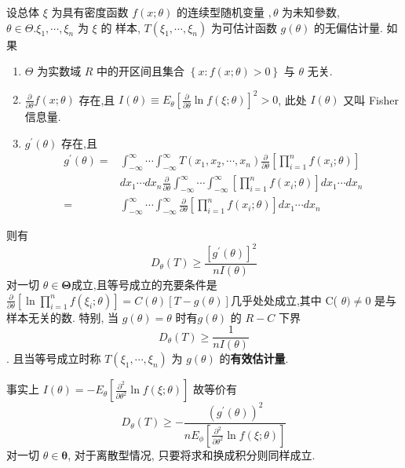 \documentclass[10pt]{yerbaformat}
\begin{document}
\begin{theorem}{\label{cr}}
    设总体 $\xi$ 为具有密度函数 $f(x ; \theta)$ 的连续型随机变量 $, \theta$ 为未知參数, $\theta \in \Theta . \xi_{1}, \cdots, \xi_{n}$ 为 $\xi$ 的 样本, $T\left(\xi_{1}, \cdots, \xi_{n}\right)$ 为可估计函数 $g(\theta)$ 的无偏估计量. 如果
    \begin{enumerate}
        \item $\Theta$ 为实数域 $R$ 中的开区间且集合 $\left\{x: f(x; \theta)>0 \right\}$ 与 $\theta$ 无关.
        \item $\frac{\partial}{\partial \theta} f(x ; \theta)$ 存在,且 $I(\theta) \equiv E_{\theta}\left[\frac{\partial}{\partial \theta} \ln f(\xi ; \theta)\right]^{2}>0$, 此处 $I(\theta)$ 又叫 Fisher 信息量.
        \item $g^{\prime}(\theta)$ 存在,且$$\begin{aligned}
                      g^{\prime}(\theta)= & \int_{-\infty}^{\infty} \cdots \int_{-\infty}^{\infty} T\left(x_{1}, x_{2}, \cdots, x_{n}\right) \frac{\partial}{\partial \theta}\left[\prod_{i=1}^{n} f\left(x_{i} ; \theta\right)\right]     \\
                                          & d x_{1} \cdots d x_{n} \frac{\partial}{\partial \theta} \int_{-\infty}^{\infty} \cdots \int_{-\infty}^{\infty}\left[\prod_{i=1}^{n} f\left(x_{i} ; \theta\right)\right] d x_{1} \cdots d x_{n} \\
                      =                   & \int_{-\infty}^{\infty} \cdots \int_{-\infty}^{\infty} \frac{\partial}{\partial \theta}\left[\prod_{i=1}^{n} f\left(x_{i} ; \theta\right)\right] d x_{1} \cdots d x_{n}
                  \end{aligned}$$
    \end{enumerate}
    则有$$D_{\theta}(T) \geqslant \frac{\left[g^{\prime}(\theta)\right]^{2}}{n I(\theta)}$$ 对一切 $\theta \in \boldsymbol{\Theta}$成立,且等号成立的充要条件是$\frac{\partial}{\partial \theta}\left[\ln \prod_{i=1}^{n} f\left(\xi_{i} ; \theta\right)\right]=C(\theta)[T-g(\theta)]$几乎处处成立,其中 C( $\theta) \neq 0$ 是与样本无关的数. 特别, 当 $g(\theta)=\theta$ 时有$g(\theta)$ 的 $R-C$ 下界$$D_{\theta}(T) \geqslant \frac{1}{n I(\theta)}$$. 且当等号成立时称 $T\left(\xi_{1}, \cdots, \xi_{n}\right)$ 为 $g(\theta)$ 的\textbf{有效估计量}.
\end{theorem}

\par 事实上 $I(\theta)=-E_{\theta}\left[\frac{\partial^{2}}{\partial \theta^{2}} \ln f(\xi ; \theta)\right]$ 故等价有 $$D_{\theta}(T) \geqslant-\frac{\left(g^{\prime}(\theta)\right)^{2}}{n E_{\phi}\left[\frac{\partial^{2}}{\partial \theta^{2}} \ln f(\xi ; \theta)\right]}$$ 对一切 $\theta \in \boldsymbol{\theta}$, 对于离散型情况, 只要将求和换成积分则同样成立.
\end{document}
